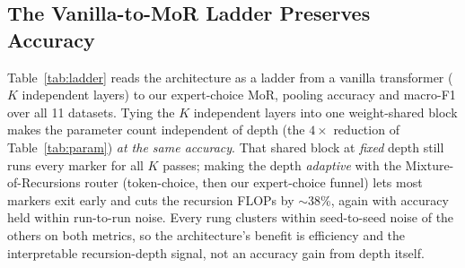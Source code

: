 \documentclass[letterpaper]{article}
\begin{document}
\subsection{The Vanilla-to-MoR Ladder Preserves Accuracy}
\label{sec:ladder}
Table~\ref{tab:ladder} reads the architecture as a ladder from a vanilla transformer
($K$ independent layers) to our expert-choice MoR, pooling accuracy and macro-F1 over all
11 datasets. Tying the $K$ independent layers into one weight-shared block makes
the parameter count independent of depth (the $4\times$ reduction of
Table~\ref{tab:param}) \emph{at the same accuracy}. That shared block at \emph{fixed}
depth still runs every marker for all $K$ passes; making the depth \emph{adaptive} with
the Mixture-of-Recursions router (token-choice, then our expert-choice funnel) lets most
markers exit early and cuts the recursion FLOPs by $\sim$38\%, again with
accuracy held within run-to-run noise. Every rung clusters within seed-to-seed noise of
the others on both metrics, so the architecture's benefit is efficiency and the
interpretable recursion-depth signal, not an accuracy gain from depth itself.
\end{document}
